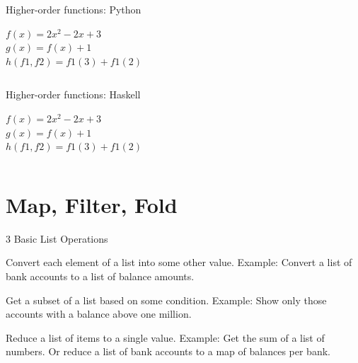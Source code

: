 \documentclass{beamer}
\begin{document}
\begin{frame}{Higher-order functions: Python}

  {\large $f(x) = 2x^2 - 2x + 3$}\\
  {\large $g(x) = f(x) + 1$}\\
  {\large $h(f1, f2) = f1(3) + f1(2)$}\\

  \vskip5mm

  \inputminted[firstline=3,lastline=10]{python}{code/python/higher_order.py}

\end{frame}

\begin{frame}{Higher-order functions: Haskell}

  {\large $f(x) = 2x^2 - 2x + 3$}\\
  {\large $g(x) = f(x) + 1$}\\
  {\large $h(f1, f2) = f1(3) + f1(2)$}\\

  \vskip5mm

  \inputminted[lastline=5]{haskell}{code/haskell/higher_order.hs}

\end{frame}

\section{Map, Filter, Fold}

\begin{frame}{3 Basic List Operations}

  \begin{description}[<+->]
  \item[Map] Convert each element of a list into some other value.
    Example: Convert a list of bank accounts to a list of balance amounts.
  \item[Filter] Get a subset of a list based on some condition.
    Example: Show only those accounts with a balance above one million.
  \item[Fold] Reduce a list of items to a single value.
    Example: Get the sum of a list of numbers.
    Or reduce a list of bank accounts to a map of balances per bank.
  \end{description}

\end{frame}
\end{document}
